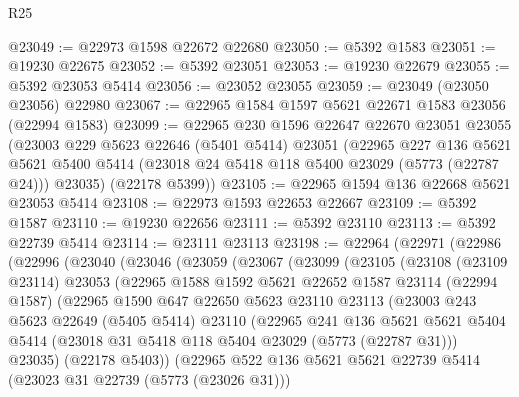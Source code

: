 \begin{lexlean}{R25}
\begin{coremodule}
@23049 := @22973 @1598 @22672 @22680
@23050 := @5392 @1583
@23051 := @19230 @22675
@23052 := @5392 @23051
@23053 := @19230 @22679
@23055 := @5392 @23053 @5414
@23056 := @23052 @23055
@23059 := @23049 (@23050 @23056) @22980
@23067 := @22965 @1584 @1597 @5621 @22671 @1583 @23056 (@22994 @1583)
@23099 := @22965
    @230
    @1596
    @22647
    @22670
    @23051
    @23055
    (@23003
      @229
      @5623
      @22646
      (@5401 @5414)
      @23051
      (@22965
        @227
        @136
        @5621
        @5621
        @5400
        @5414
        (@23018 @24 @5418 @118 @5400 @23029 (@5773 (@22787 @24)))
        @23035)
      (@22178 @5399))
@23105 := @22965 @1594 @136 @22668 @5621 @23053 @5414
@23108 := @22973 @1593 @22653 @22667
@23109 := @5392 @1587
@23110 := @19230 @22656
@23111 := @5392 @23110
@23113 := @5392 @22739 @5414
@23114 := @23111 @23113
@23198 := @22964
    (@22971
      (@22986
        (@22996
          (@23040
            (@23046
              (@23059
                (@23067
                  (@23099
                    (@23105
                      (@23108
                        (@23109 @23114)
                        @23053
                        (@22965
                          @1588
                          @1592
                          @5621
                          @22652
                          @1587
                          @23114
                          (@22994 @1587)
                          (@22965
                            @1590
                            @647
                            @22650
                            @5623
                            @23110
                            @23113
                            (@23003
                              @243
                              @5623
                              @22649
                              (@5405 @5414)
                              @23110
                              (@22965
                                @241
                                @136
                                @5621
                                @5621
                                @5404
                                @5414
                                (@23018 @31 @5418 @118 @5404 @23029 (@5773 (@22787 @31)))
                                @23035)
                              (@22178 @5403))
                            (@22965
                              @522
                              @136
                              @5621
                              @5621
                              @22739
                              @5414
                              (@23023 @31 @22739 (@5773 (@23026 @31)))

\end{coremodule}
\end{lexlean}
